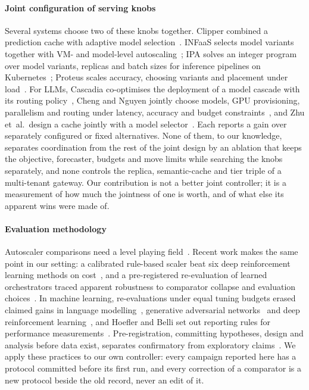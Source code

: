 \paragraph{Joint configuration of serving knobs}
Several systems choose two of these knobs together. Clipper combined a
prediction cache with adaptive model selection~\cite{clipper}. INFaaS
selects model variants together with VM- and model-level
autoscaling~\cite{infaas}; IPA solves an integer program over model
variants, replicas and batch sizes for inference pipelines on
Kubernetes~\cite{ipa}; Proteus scales accuracy, choosing variants and
placement under load~\cite{proteus}. For LLMs, Cascadia co-optimises the
deployment of a model cascade with its routing policy~\cite{cascadia},
Cheng and Nguyen jointly choose models, GPU provisioning, parallelism and
routing under latency, accuracy and budget constraints~\cite{chengnguyen},
and Zhu et~al.\ design a cache jointly with a model selector~\cite{zhu2023}.
Each reports a gain over separately configured or fixed alternatives. None
of them, to our knowledge, separates coordination from the rest of the
joint design by an ablation that keeps the objective, forecaster, budgets
and move limits while searching the knobs separately, and none controls the
replica, semantic-cache and tier triple of a multi-tenant gateway. Our
contribution is not a better joint controller; it is a measurement of how
much the jointness of one is worth, and of what else its apparent wins
were made of.

\paragraph{Evaluation methodology}
Autoscaler comparisons need a level playing field~\cite{chameleon}.
Recent work makes the same point in our setting: a calibrated rule-based
scaler beat six deep reinforcement learning methods on
cost~\cite{zhang2026drl}, and a pre-registered re-evaluation of learned
orchestrators traced apparent robustness to comparator collapse and
evaluation choices~\cite{khilji2026}. In machine learning, re-evaluations
under equal tuning budgets erased claimed gains in language
modelling~\cite{melis2018}, generative adversarial networks~\cite{lucic2018}
and deep reinforcement learning~\cite{henderson2018}, and Hoefler and Belli
set out reporting rules for performance measurements~\cite{hoefler2015}.
Pre-registration, committing hypotheses, design and analysis before data
exist, separates confirmatory from exploratory claims~\cite{nosek2018}.
We apply these practices to our own controller: every campaign reported
here has a protocol committed before its first run, and every correction
of a comparator is a new protocol beside the old record, never an edit of
it.

